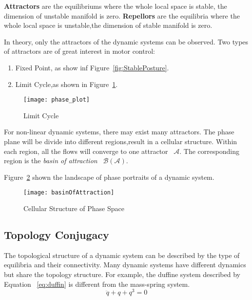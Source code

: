\textbf{Attractors} are the equilibriums where the whole local space is stable, the dimension of unstable manifold is zero.
\textbf{Repellors} are the equilibria where the whole local space is unstable,the dimension of stable manifold is zero.







In theory, only the attractors of the dynamic systems can be observed.
Two types of attractors are of great interest in motor control:
\begin{enumerate}
 \item Fixed Point, as show inf Figure~\ref{fig:StablePosture}.
 \item Limit Cycle,as shown in Figure~\ref{fig:ecycle}.
\end{enumerate}

\begin{figure}
	\begin{center}
	\texttt{[image: phase\_plot]}
	\end{center}
	\caption{Limit Cycle}
	\label{fig:ecycle}
\end{figure}





For non-linear dynamic systems, there may exist many attractors.
The phase plane will be divide into different regions,result in a cellular structure.
Within each region, all the flows will converge to one attractor ~$\mathcal{A}$.
The corresponding region is  the \emph{basin of attraction} ~$\mathcal{B}(\mathcal{A})$.

Figure~\ref{fig:manyboa} shown the landscape of phase portraits of a dynamic system.
\begin{figure}
\begin{center}
\texttt{[image: basinOfAttraction]}
\end{center}
\caption{Cellular Structure of Phase Space}
\label{fig:manyboa}
\end{figure}




\subsection{Topology Conjugacy}
The topological structure of a dynamic system can be described by the type of equilibria and their connectivity.
Many dynamic systems have different dynamics but share the topology structure.
For example, the duffine system described by Equation ~\ref{eq:duffin} is different from the mass-spring system.
\begin{equation}
\label{eq:duffin}
\ddot{q}+q+q^{3}=0
\end{equation}

